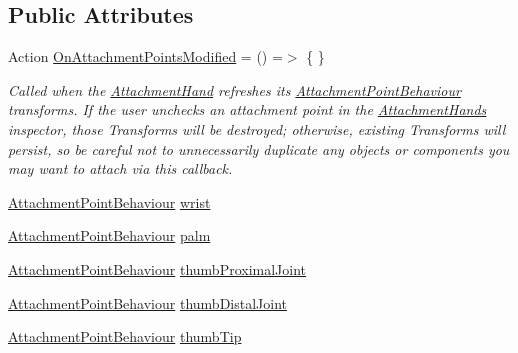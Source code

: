 \subsection*{Public Attributes}
\begin{DoxyCompactItemize}
\item 
Action \mbox{\hyperlink{class_leap_1_1_unity_1_1_attachments_1_1_attachment_hand_a46767d010896459f352638e42c0bd5d1}{On\+Attachment\+Points\+Modified}} = () =$>$ \{ \}
\begin{DoxyCompactList}\small\item\em Called when the \mbox{\hyperlink{class_leap_1_1_unity_1_1_attachments_1_1_attachment_hand}{Attachment\+Hand}} refreshes its \mbox{\hyperlink{class_leap_1_1_unity_1_1_attachments_1_1_attachment_point_behaviour}{Attachment\+Point\+Behaviour}} transforms. If the user unchecks an attachment point in the \mbox{\hyperlink{class_leap_1_1_unity_1_1_attachments_1_1_attachment_hands}{Attachment\+Hands}} inspector, those Transforms will be destroyed; otherwise, existing Transforms will persist, so be careful not to unnecessarily duplicate any objects or components you may want to attach via this callback. \end{DoxyCompactList}\item 
\mbox{\hyperlink{class_leap_1_1_unity_1_1_attachments_1_1_attachment_point_behaviour}{Attachment\+Point\+Behaviour}} \mbox{\hyperlink{class_leap_1_1_unity_1_1_attachments_1_1_attachment_hand_a92a8b41e8e6213733acf1b9c727d2b12}{wrist}}
\item 
\mbox{\hyperlink{class_leap_1_1_unity_1_1_attachments_1_1_attachment_point_behaviour}{Attachment\+Point\+Behaviour}} \mbox{\hyperlink{class_leap_1_1_unity_1_1_attachments_1_1_attachment_hand_a0466e655bffd2fcde3a92976a13e6346}{palm}}
\item 
\mbox{\hyperlink{class_leap_1_1_unity_1_1_attachments_1_1_attachment_point_behaviour}{Attachment\+Point\+Behaviour}} \mbox{\hyperlink{class_leap_1_1_unity_1_1_attachments_1_1_attachment_hand_a8b37e85a9a82e6c8263f1454b8cb7bd2}{thumb\+Proximal\+Joint}}
\item 
\mbox{\hyperlink{class_leap_1_1_unity_1_1_attachments_1_1_attachment_point_behaviour}{Attachment\+Point\+Behaviour}} \mbox{\hyperlink{class_leap_1_1_unity_1_1_attachments_1_1_attachment_hand_a354bb57f69d9929dd074ba07c1a5d5a2}{thumb\+Distal\+Joint}}
\item 
\mbox{\hyperlink{class_leap_1_1_unity_1_1_attachments_1_1_attachment_point_behaviour}{Attachment\+Point\+Behaviour}} \mbox{\hyperlink{class_leap_1_1_unity_1_1_attachments_1_1_attachment_hand_af4a0720fe7831d8e91d1237be65e69dc}{thumb\+Tip}}

\end{DoxyCompactItemize}
